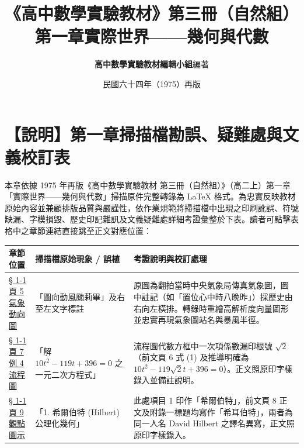 \documentclass[a4paper,12pt,twoside]{article}
\title{\LARGE\textbf{《高中數學實驗教材》第三冊（自然組）}\\[0.5em] \Large\textbf{第一章\quad 實際世界——幾何與代數}}
\author{\textbf{高中數學實驗教材編輯小組}\quad 編著}
\date{民國六十四年（1975）再版}
\begin{document}
\maketitle
\thispagestyle{firstpage}

\section*{【說明】第一章掃描檔勘誤、疑難處與文義校訂表}
\label{sec:errata_notes_b3_ch1}
\label{sec:current_errata}

本章依據 1975 年再版《高中數學實驗教材 第三冊（自然組）》（高二上）第一章「實際世界——幾何與代數」掃描原件完整轉錄為 \LaTeX{} 格式。為忠實反映教材原始內容並兼顧排版品質與嚴謹性，依作業規範將掃描檔中出現之印刷訛誤、符號缺漏、字模損毀、歷史印記雜訊及文義疑難處詳細考證彙整於下表。讀者可點擊表格中之章節連結直接跳至正文對應位置：

\begin{table}[H]
\centering
\small
\renewcommand{\arraystretch}{1.35}
\begin{tabularx}{\textwidth}{|p{3.2cm}|p{3.6cm}|X|}
\hline
\textbf{章節位置} & \textbf{掃描檔原始現象 / 誤植} & \textbf{考證說明與校訂處理} \\ \hline

\hyperref[note:b3-ch1-p5-typhoon-map]{§ 1-1 頁 5 氣象動向圖} & 
「圖向動風颱莉畢」及右至左文字標註 & 
原圖為翻拍當時中央氣象局傳真氣象圖，圖中註記（如「置位心中時八晚昨」）採歷史由右向左橫排。轉錄時重繪高解析度向量圖形並忠實再現氣象圖站名與暴風半徑。 \\ \hline

\hyperref[note:b3-ch1-p7-flowchart-sqrt2]{§ 1-1 頁 7 例 4 流程圖} & 
「解 $10t^2 - 119t + 396 = 0$ 之一元二次方程式」 & 
流程圖代數方框中一次項係數漏印根號 $\sqrt{2}$（前文頁 6 式 (1) 及推導明確為 $10t^2 - 119\sqrt{2}t + 396 = 0$）。正文照原印字樣錄入並備註說明。 \\ \hline

\hyperref[note:b3-ch1-p9-hilbert-name]{§ 1-1 頁 9 觀點圖示} & 
「1. 希爾伯特 (Hilbert) 公理化幾何」 & 
此處項目 1 印作「希爾伯特」，前文頁 8 正文及附錄一標題均寫作「希耳伯特」，兩者為同一人名 David Hilbert 之譯名異寫，正文照原印字樣錄入。 \\ \hline

\end{tabularx}
\end{table}

\clearpage
\tableofcontents
\newpage


\end{document}
